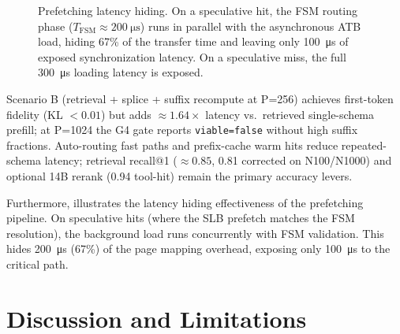 \documentclass[conference,10pt]{IEEEtran}
\begin{document}
\begin{figure}[h]
\centering
{}
\caption{Prefetching latency hiding. On a speculative hit, the FSM routing phase ($T_{\text{FSM}} \approx \SI{200}{\micro\second}$) runs in parallel with the asynchronous ATB load, hiding 67\% of the transfer time and leaving only \SI{100}{\micro\second} of exposed synchronization latency. On a speculative miss, the full \SI{300}{\micro\second} loading latency is exposed.}
\label{fig:latency_hiding}
\end{figure}

Scenario B (retrieval + splice + suffix recompute at P=256) achieves first-token fidelity (KL $<0.01$) but adds \(\approx\!1.64\times\) latency vs.\ retrieved single-schema prefill; at P=1024 the G4 gate reports \texttt{viable=false} without high suffix fractions. Auto-routing fast paths and prefix-cache warm hits reduce repeated-schema latency; retrieval recall@1 (\(\approx\!0.85\), 0.81 corrected on N100/N1000) and optional 14B rerank (0.94 tool-hit) remain the primary accuracy levers.

Furthermore,  illustrates the latency hiding effectiveness of the prefetching pipeline. On speculative hits (where the SLB prefetch matches the FSM resolution), the background load runs concurrently with FSM validation. This hides \SI{200}{\micro\second} (67\%) of the page mapping overhead, exposing only \SI{100}{\micro\second} to the critical path.

\section{Discussion and Limitations}
\label{sec:discussion}
\end{document}
